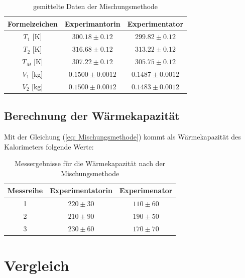 \documentclass[bibliography=totocnumbered]{scrartcl}
\begin{document}
	\begin{table}[ht!]
		\centering
		\caption[Daten]{gemittelte Daten der Mischungsmethode}
		\begin{tabular}{|c||c|c|}
			\hline
			\textbf{Formelzeichen} & \textbf{Experimantorin} & \textbf{Experimentator} \\
			\hline\hline
			$ T_{1} $ [K] & $300.18 \pm0.12 $ & $ 299.82\pm0.12 $ \\
			\hline
			$ T_{2} $ [K]& $316.68 \pm 0.12$ &  $ 313.22\pm 0.12$\\
			\hline
			$ T_{M} $ [K]& $ 307.22\pm 0.12$ & $ 305.75\pm0.12 $ \\
			\hline
			$ V_{1} $ [kg] &$ 0.1500\pm 0.0012$  &$ 0.1487\pm0.0012 $  \\
			\hline
			$ V_{2} $ [kg]& $ 0.1500\pm 0.0012$ &$0.1483 \pm0.0012 $  \\
			\hline
		\end{tabular}
		\label{tab: Daten Mischungsmethoden}
	\end{table}
	
	\subsection{Berechnung der Wärmekapazität}
	Mit der Gleichung (\ref{eq: Mischungsmethode}) kommt als Wärmekapazität des Kalorimeters folgende Werte:
	
	\begin{table}[ht!]
		\centering
		\caption[Wärmekapazität]{Messergebnisse für die Wärmekapazität nach der Mischungsmethode}
		\begin{tabular}{|c||c|c|}
			\hline
			\textbf{Messreihe} & \textbf{Experimentatorin} & \textbf{Experimenator} \\
			\hline\hline
			1 & $ 220\pm30 $ &$ 110\pm60 $  \\
			\hline
			2 & $ 210\pm90 $ & $ 190\pm 50$ \\
			\hline
			3 & $ 230\pm60 $ & $170 \pm 70$ \\
			\hline
		\end{tabular}
		\label{Abb: Wärmekapazität Mischungsmethode}
	\end{table}
	
	
	\section{Vergleich}
	
\end{document}

